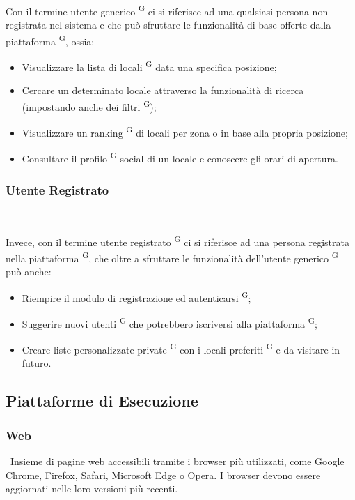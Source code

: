 Con il termine utente generico \textsuperscript{G} ci si riferisce ad una qualsiasi persona non registrata nel sistema e che può sfruttare le funzionalità di base offerte dalla piattaforma \textsuperscript{G}, ossia:

\begin{itemize}
  \item Visualizzare la lista di locali \textsuperscript{G} data una specifica posizione;
  \item Cercare un determinato locale attraverso la funzionalità di ricerca (impostando anche dei filtri \textsuperscript{G});
  \item Visualizzare un ranking \textsuperscript{G} di locali per zona o in base alla propria posizione;
  \item Consultare il profilo \textsuperscript{G} social di un locale e conoscere gli orari di apertura.
\end{itemize}

\subsubsection{Utente Registrato} \ 

Invece, con il termine utente registrato \textsuperscript{G} ci si riferisce ad una persona registrata nella piattaforma \textsuperscript{G}, che oltre a sfruttare le funzionalità dell’utente generico \textsuperscript{G} può anche:

\begin{itemize}
  \item Riempire il modulo di registrazione ed autenticarsi \textsuperscript{G};
  \item Suggerire nuovi utenti \textsuperscript{G} che potrebbero iscriversi alla piattaforma \textsuperscript{G};
  \item Creare liste personalizzate private \textsuperscript{G} con i locali preferiti \textsuperscript{G} e da visitare in futuro.
\end{itemize}

\subsection{Piattaforme di Esecuzione}

\subsubsection{Web} \ 
Insieme di pagine web accessibili tramite i browser più utilizzati, come Google Chrome, Firefox, Safari, Microsoft Edge o Opera. I browser devono essere aggiornati nelle loro versioni più recenti.

